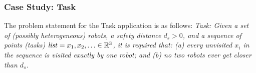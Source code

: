 

\newcommand{\Task}{\textsf{Task}\xspace}

\subsubsection{Case Study: \Task}
The problem statement for the \Task application is as follows: {\small \em \Task: Given a set of (possibly heterogeneous) robots, a safety distance $d_s>0$, and a sequence of points (tasks) $\mathit{list} = x_1, x_2, \ldots \in \reals^3$, it is required that: (a) every unvisited $x_i$ in the sequence is {\em visited\/} exactly by one robot; and (b) no two robots ever get closer than $d_s$.\/}


